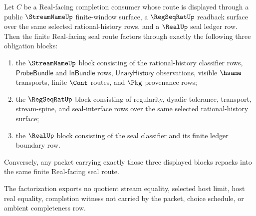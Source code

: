\begin{theorem}
\label{thm:streamname-regseq-real-seal-obligation-factorization}
Let $C$ be a Real-facing completion consumer whose route is displayed through
a public $\StreamNameUp$ finite-window surface, a $\RegSeqRatUp$ readback
surface over the same selected rational-history rows, and a $\RealUp$ seal
ledger row. Then the finite Real-facing seal route factors through exactly the
following three obligation blocks:
\begin{enumerate}
  \item the $\StreamNameUp$ block consisting of the rational-history
  classifier rows, $\mathsf{ProbeBundle}$ and $\mathsf{InBundle}$ rows,
  $\mathsf{UnaryHistory}$ observations, visible $\hsame$ transports, finite
  $\Cont$ routes, and $\Pkg$ provenance rows;
  \item the $\RegSeqRatUp$ block consisting of regularity,
  dyadic-tolerance, transport, stream-spine, and seal-interface rows over the
  same selected rational-history surface;
  \item the $\RealUp$ block consisting of the seal classifier and its finite
  ledger boundary row.
\end{enumerate}
Conversely, any packet carrying exactly those three displayed blocks repacks
into the same finite Real-facing seal route.

The factorization exports no quotient stream equality, selected host limit,
host real equality, completion witness not carried by the packet, choice
schedule, or ambient completeness row.
\end{theorem}
